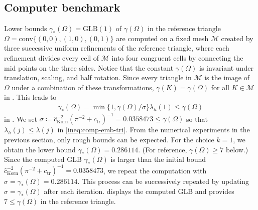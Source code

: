 \documentclass[a4paper]{amsart}
\numberwithin{equation}{section}
\newcommand{\Mcal}{\mathcal{M}}
\theoremstyle{remark}
\theoremstyle{definition}
\theoremstyle{assumptionnoperiod}
\begin{document}
\subsection{Computer benchmark}\label{sec:ex-comp-emb}
Lower bounds $\gamma_*(\Omega) = \mathrm{GLB}(1)$ of $\gamma(\Omega)$ in the reference triangle $\Omega = \mathrm{conv}\{(0,0),(1,0),(0,1)\}$ are computed on a fixed mesh $\Mcal$ created by three successive uniform refinements of the reference triangle, where each refinement divides every cell of $\Mcal$ into four congruent cells by connecting the mid points on the three sides.
Notice that the constant $\gamma(\Omega)$ is invariant under translation, scaling, and half rotation.
Since every triangle in $\Mcal$ is the image of $\Omega$ under a combination of these transformations,
$\gamma(K) = \gamma(\Omega)$ for all $K \in \Mcal$ in . This leads to
\begin{align}\label{ineq:comp-emb-tri}
	\gamma_*(\Omega) = \min\{1,\gamma(\Omega)/\sigma\} \lambda_h(1) \leq \gamma(\Omega)
\end{align}
in .
We set $\sigma \coloneqq \hat{c}_\mathrm{Korn}^{-2}(\pi^{-2} + c_\mathrm{tr})^{-1} = 0.0358473 \leq \gamma(\Omega)$ so that $\lambda_h(j) \leq \lambda(j)$ in \eqref{ineq:comp-emb-tri}.
From the numerical experiments in the previous section, only rough bounds can be expected.
For the choice $k = 1$, we obtain the lower bound $\gamma_*(\Omega) = 0.286114$. (For reference, $\gamma(\Omega) \geq 7$ below.)
Since the computed GLB $\gamma_*(\Omega)$ is larger than the initial bound
$\hat{c}_\mathrm{Korn}^{-2}(\pi^{-2} + c_\mathrm{tr})^{-1} = 0.0358473$, we repeat the computation with $\sigma = \gamma_*(\Omega) = 0.286114$. This process can be successively repeated by updating $\sigma = \gamma_*(\Omega)$ after each iteration.
 displays the computed GLB and provides $7 \leq \gamma(\Omega)$ in the reference triangle.
\end{document}
